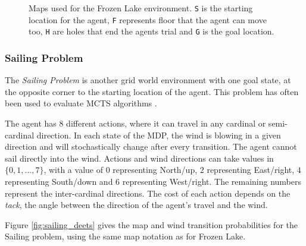 \begin{figure}
                \caption[Maps used for the Frozen Lake environment.]{Maps used for the Frozen Lake environment. \texttt{S} is the starting location for the agent, \texttt{F} represents floor that the agent can move too, \texttt{H} are holes that end the agents trial and \texttt{G} is the goal location.   }
                \label{fig:fl_maps}
            \end{figure}




        \subsubsection{Sailing Problem}
            The \emph{Sailing Problem} is another grid world environment with one goal state, at the opposite corner to the starting location of the agent. This problem has often been used to evaluate MCTS algorithms \cite{peret2004line,uct,tolpin2012mcts,brue1}. 
            
            The agent has 8 different actions, where it can travel in any cardinal or semi-cardinal direction. In each state of the MDP, the wind is blowing in a given direction and will stochastically change after every transition. The agent cannot sail directly into the wind. Actions and wind directions can take values in $\{0,1,...,7\}$, with a value of $0$ representing North/up, $2$ representing East/right, $4$ representing South/down and $6$ representing West/right. The remaining numbers represent the inter-cardinal directions. The cost of each action depends on the \textit{tack}, the angle between the direction of the agent's travel and the wind. 

            Figure \ref{fig:sailing_deets} gives the map and wind transition probabilities for the Sailing problem, using the same map notation as for Frozen Lake. 

